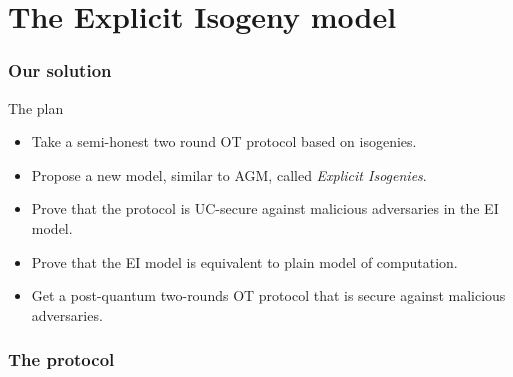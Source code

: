 \documentclass{beamer}
\begin{document}
    
    \section{The Explicit Isogeny model}
        
    \begin{frame}
        \frametitle{Our solution}
        
        \begin{block}{The plan}
            \begin{itemize}
                \item Take a semi-honest two round OT protocol based on isogenies.
                \item Propose a new model, similar to AGM, called \emph{Explicit Isogenies}.
                \item Prove that the protocol is UC-secure against malicious adversaries in the EI model.
                \item {\color{gray}Prove that the EI model is equivalent to plain model of computation.}
                \item Get a post-quantum two-rounds OT protocol that is secure against malicious adversaries.
            \end{itemize}
        \end{block}
    \end{frame}

    \begin{frame}
        \frametitle{The protocol}
        
        \begin{center}
        \end{center}

    \end{frame}
\end{document}
